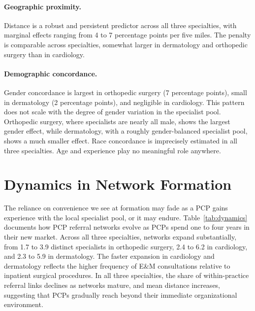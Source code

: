 \documentclass[12pt]{article}
\begin{document}
\paragraph{Geographic proximity.} Distance is a robust and persistent predictor across all three specialties, with marginal effects ranging from 4 to 7 percentage points per five miles. The penalty is comparable across specialties, somewhat larger in dermatology and orthopedic surgery than in cardiology.

\paragraph{Demographic concordance.} Gender concordance is largest in orthopedic surgery (7 percentage points), small in dermatology (2 percentage points), and negligible in cardiology. This pattern does not scale with the degree of gender variation in the specialist pool. Orthopedic surgery, where specialists are nearly all male, shows the largest gender effect, while dermatology, with a roughly gender-balanced specialist pool, shows a much smaller effect. Race concordance is imprecisely estimated in all three specialties. Age and experience play no meaningful role anywhere.

\section{Dynamics in Network Formation}
\label{sec:dynamics}

The reliance on convenience we see at formation may fade as a PCP gains experience with the local specialist pool, or it may endure. Table~\ref{tab:dynamics} documents how PCP referral networks evolve as PCPs spend one to four years in their new market. Across all three specialties, networks expand substantially, from 1.7 to 3.9 distinct specialists in orthopedic surgery, 2.4 to 6.2 in cardiology, and 2.3 to 5.9 in dermatology. The faster expansion in cardiology and dermatology reflects the higher frequency of E\&M consultations relative to inpatient surgical procedures. In all three specialties, the share of within-practice referral links declines as networks mature, and mean distance increases, suggesting that PCPs gradually reach beyond their immediate organizational environment.
\end{document}
